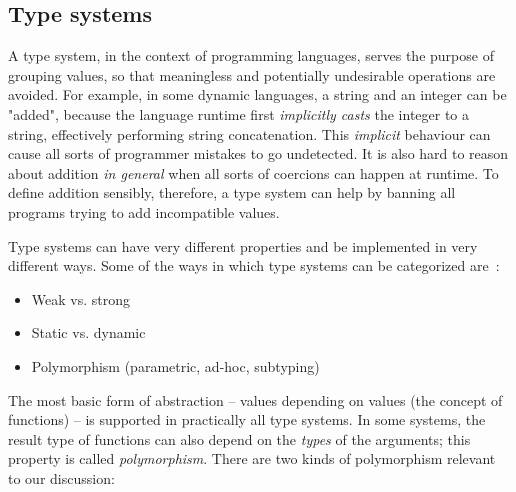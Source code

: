         \subsection{Type systems}
        \label{subsec:type-systems}
            A type system, in the context of programming languages,
            serves the purpose of grouping values, so that meaningless and potentially undesirable operations are avoided.
            For example, in some dynamic languages, a string and an integer can be "added",
            because the language runtime first \emph{implicitly casts} the integer to a string,
            effectively performing string concatenation.
            This \emph{implicit} behaviour can cause all sorts of programmer mistakes to go undetected.
            It is also hard to reason about addition \emph{in general} when all sorts
            of coercions can happen at runtime.
            To define addition sensibly, therefore, a type system can help by
            banning all programs trying to add incompatible values.

            Type systems can have very different properties and be implemented in very different ways.
            Some of the ways in which type systems can be categorized are~\cite{understanding-types-cardelli}:

            \begin{itemize}
                \item Weak vs. strong
                \item Static vs. dynamic
                \item Polymorphism (parametric, ad-hoc, subtyping)
            \end{itemize}

            The most basic form of abstraction – values depending on values (the concept of functions) – is
            supported in practically all type systems.
            In some systems, the result type of functions can also depend on the \emph{types} of the arguments;
            this property is called \emph{polymorphism}.
            There are two kinds of polymorphism relevant to our discussion:

